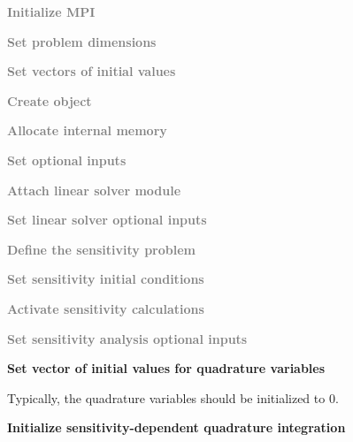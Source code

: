 \begin{Steps}
  
\item 
  \textcolor{gray}{\bf {\p} Initialize MPI}

\item
  \textcolor{gray}{\bf Set problem dimensions}


  
\item
  \textcolor{gray}{\bf Set vectors of initial values}
 
\item
  \textcolor{gray}{\bf Create {\cvodes} object}

\item
  \textcolor{gray}{\bf Allocate internal memory}

\item
  \textcolor{gray}{\bf Set optional inputs}

\item
  \textcolor{gray}{\bf Attach linear solver module}

\item
  \textcolor{gray}{\bf Set linear solver optional inputs}

\item\label{i:quad_sens_sens_def}
  \textcolor{gray}{\bf Define the sensitivity problem}

\item
  \textcolor{gray}{\bf Set sensitivity initial conditions}

\item
  \textcolor{gray}{\bf Activate sensitivity calculations}

\item
  \textcolor{gray}{\bf Set sensitivity analysis optional inputs}

\item
  {\bf Set vector of initial values for quadrature variables}

  Typically, the quadrature variables should be initialized to $0$.

\item\label{i:quad_sens_init}
  {\bf Initialize sensitivity-dependent quadrature integration}


\end{Steps}
